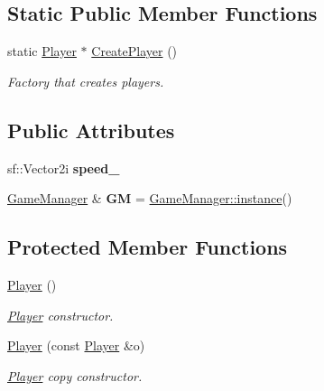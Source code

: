 \subsection*{Static Public Member Functions}
\begin{DoxyCompactItemize}
\item 
static \hyperlink{class_player}{Player} $\ast$ \hyperlink{class_player_ad2426f529ae2cfb0d8fb3cecbe2593b4}{Create\+Player} ()
\begin{DoxyCompactList}\small\item\em Factory that creates players. \end{DoxyCompactList}\end{DoxyCompactItemize}
\subsection*{Public Attributes}
\begin{DoxyCompactItemize}
\item 
\mbox{\label{class_player_ab169a84bf84d4ddc62f6120e7255805c}} 
sf\+::\+Vector2i {\bfseries speed\+\_\+}
\item 
\mbox{\label{class_player_aedd86e3688c3b841e9a167491825b934}} 
\hyperlink{class_game_manager}{Game\+Manager} \& {\bfseries GM} = \hyperlink{class_game_manager_afa37ab23c040b5225d567d4c9ab854e1}{Game\+Manager\+::instance}()
\end{DoxyCompactItemize}
\subsection*{Protected Member Functions}
\begin{DoxyCompactItemize}
\item 
\hyperlink{class_player_affe0cc3cb714f6deb4e62f0c0d3f1fd8}{Player} ()
\begin{DoxyCompactList}\small\item\em \hyperlink{class_player}{Player} constructor. \end{DoxyCompactList}\item 
\hyperlink{class_player_a608b5f4723b8a2a159f53bdcedfa0fda}{Player} (const \hyperlink{class_player}{Player} \&o)
\begin{DoxyCompactList}\small\item\em \hyperlink{class_player}{Player} copy constructor. \end{DoxyCompactList}\end{DoxyCompactItemize}

